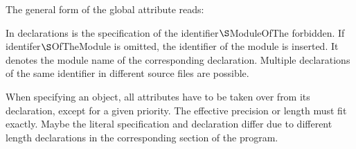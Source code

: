 The general form of the global attribute reads:



In declarations is the specification of the identifier$\S $ModuleOfThe forbidden.
If identifer$\S $OfTheModule  is omitted, the identifier of the module is inserted.
It denotes the module name of the corresponding
declaration.
Multiple declarations of the same identifier in different source files 
are possible.



When specifying an object, all attributes have to be taken over from its
declaration, except for a given priority. 
The effective precision or length 
must fit exactly. Maybe the literal specification and declaration differ 
due to different length declarations
 in the corresponding section of the program.



